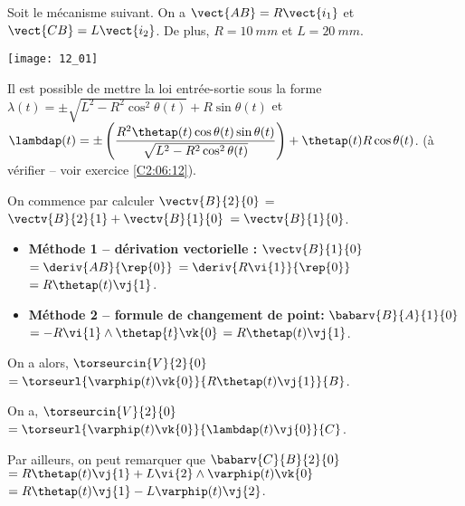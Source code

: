 \normaltrue \difficilefalse \tdifficilefalse
\correctionfalse


\setcounter{question}{0}%
\ifcorrection
\else
{}
\fi

\ifprof
\else
Soit le mécanisme suivant. On a $\vect{AB}=R\vect{i_1}$ et $\vect{CB}=L\vect{i_2}$. De plus, 
$R=\SI{10}{mm}$ et $L=\SI{20}{mm}$. 

\begin{marginfigure}
\texttt{[image: 12\_01]}
\end{marginfigure}
\fi

Il est possible de mettre la loi entrée-sortie sous la forme  
$\lambda(t) = \pm\sqrt{L^2 - R^2\cos^2\theta(t)} + R\sin\theta(t) $ 
et 
$\lambdap(t) = \pm\left( \dfrac{R^2 \thetap(t) \cos\theta(t)\sin\theta(t)}{\sqrt{L^2 - R^2\cos^2\theta(t)}}\right) + \thetap(t)R\cos\theta(t)$.
 (à vérifier -- voir exercice \ref{C2:06:12}).

\ifprof
On commence par calculer $\vectv{B}{2}{0}$ = $\vectv{B}{2}{1}+\vectv{B}{1}{0}$ $=\vectv{B}{1}{0}$.
\begin{itemize}
\item \textbf{Méthode 1 -- dérivation vectorielle :}  $\vectv{B}{1}{0}$ $=\deriv{AB}{\rep{0}}$ 
$=\deriv{R\vi{1}}{\rep{0}}$ 
$= R\thetap(t) \vj{1}$. 
\item \textbf{Méthode 2 -- formule de changement de point: }
$\babarv{B}{A}{1}{0}$ 
$= -R\vi{1}\wedge \thetap{t} \vk{0}$
$= R\thetap(t) \vj{1}$.
\end{itemize}

On a alors, 
$\torseurcin{V}{2}{0}$
$=\torseurl{\varphip(t)\vk{0}}{R\thetap(t) \vj{1}}{B}$.

\else
\fi


\ifprof
On a, 
$\torseurcin{V}{2}{0}$
$=\torseurl{\varphip(t)\vk{0}}{\lambdap(t) \vj{0}}{C}$.

Par ailleurs, on peut remarquer que 
$\babarv{C}{B}{2}{0}$
$= R\thetap(t) \vj{1} + L\vi{2}\wedge\varphip(t) \vk{0}$ 
$= R\thetap(t) \vj{1} - L\varphip(t)\vj{2}$.

